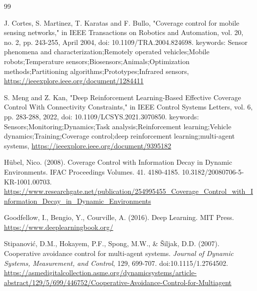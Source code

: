 \documentclass[twoside]{article}
\begin{document}

\newpage

{}


\begin{thebibliography}{99}

\vspace{\baselineskip}

J. Cortes, S. Martinez, T. Karatas and F. Bullo, "Coverage control for mobile sensing networks," in IEEE Transactions on Robotics and Automation, vol. 20, no. 2, pp. 243-255, April 2004, doi: 10.1109/TRA.2004.824698.
keywords: {Sensor phenomena and characterization;Remotely operated vehicles;Mobile robots;Temperature sensors;Biosensors;Animals;Optimization methods;Partitioning algorithms;Prototypes;Infrared sensors},
\url{https://ieeexplore.ieee.org/document/1284411}

S. Meng and Z. Kan, "Deep Reinforcement Learning-Based Effective Coverage Control With Connectivity Constraints," in IEEE Control Systems Letters, vol. 6, pp. 283-288, 2022, doi: 10.1109/LCSYS.2021.3070850.
keywords: {Sensors;Monitoring;Dynamics;Task analysis;Reinforcement learning;Vehicle dynamics;Training;Coverage control;deep reinforcement learning;multi-agent systems},
\url{https://ieeexplore.ieee.org/document/9395182}

Hübel, Nico. (2008). Coverage Control with Information Decay in Dynamic Environments. IFAC Proceedings Volumes. 41. 4180-4185. 10.3182/20080706-5-KR-1001.00703. 
\url{https://www.researchgate.net/publication/254995455_Coverage_Control_with_Information_Decay_in_Dynamic_Environments}

Goodfellow, I., Bengio, Y., Courville, A. (2016). Deep Learning. MIT Press.
\url{https://www.deeplearningbook.org/}

Stipanović, D.M., Hokayem, P.F., Spong, M.W., \& Šiljak, D.D. (2007). Cooperative avoidance control for multi-agent systems. \textit{Journal of Dynamic Systems, Measurement, and Control}, 129, 699-707. doi:10.1115/1.2764502.
\url{https://asmedigitalcollection.asme.org/dynamicsystems/article-abstract/129/5/699/446752/Cooperative-Avoidance-Control-for-Multiagent}


\end{thebibliography}
\end{document}
